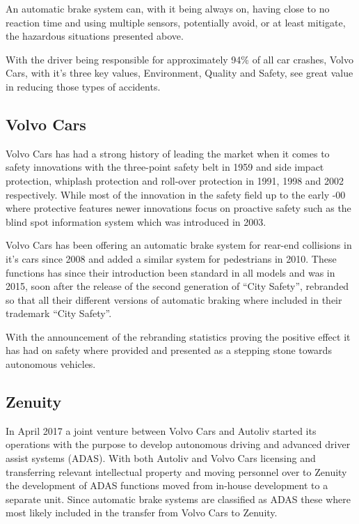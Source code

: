 \documentclass[conference]{IEEEtran}
\begin{document}
An automatic brake system can, with it being always on, having close to no reaction time and using multiple sensors, potentially avoid, or at least mitigate, the hazardous situations presented above.

With the driver being responsible for approximately 94\% of all car crashes, Volvo Cars, with it's three key values, Environment, Quality and Safety, see great value in reducing those types of accidents.\cite{CrashStats,VolvoValues}

\subsection{Volvo Cars}
Volvo Cars has had a strong history of leading the market when it comes to safety innovations with the three-point safety belt in 1959 and side impact protection, whiplash protection and roll-over protection in 1991, 1998 and 2002 respectively. 
While most of the innovation in the safety field up to the early -00 where protective features newer innovations focus on proactive safety such as the blind spot information system which was introduced in 2003.\cite{VolvoInnovation}

Volvo Cars has been offering an automatic brake system for rear-end collisions in it's cars since 2008 and added a similar system for pedestrians in 2010. \cite{VolvoInnovation}
These functions has since their introduction been standard in all models and was in 2015, soon after the release of the second generation of ``City Safety'', rebranded so that all their different versions of automatic braking where included in their trademark ``City Safety''.\cite{CitySafety}

With the announcement of the rebranding statistics proving the positive effect it has had on safety where provided and presented as a stepping stone towards autonomous vehicles.\cite{CitySafety}
\subsection{Zenuity}
In April 2017 a joint venture between Volvo Cars and Autoliv started its operations with the purpose to develop autonomous driving and advanced driver assist systems (ADAS).\cite{ZenuityLaunch} With both Autoliv and Volvo Cars licensing and transferring relevant intellectual property and moving personnel over to Zenuity the development of ADAS functions moved from in-house development to a separate unit. Since automatic brake systems are classified as ADAS these where most likely included in the transfer from Volvo Cars to Zenuity. 
\end{document}
